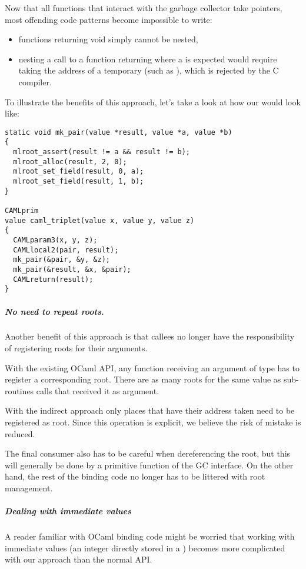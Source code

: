 \documentclass[a4paper]{easychair}
\newcommand{\cpp}[1]{\smash{\lstinline[style=C++]{#1}}}
\begin{document}
Now that all functions that interact with the garbage collector take
pointers, most offending code patterns become impossible to write:

\begin{itemize}
\item functions returning void simply cannot be nested,
\item nesting a call to a function returning \cpp{value} where a
      \cpp{value*} is expected would require taking the address of a
      temporary (such as \cpp{\&get\_field(x,\ 0)}), which is rejected by the C
      compiler.
\end{itemize}

To illustrate the benefits of this approach, let's take a look at how
our \cpp{triplet} would look like:

\begin{lstlisting}[style=C++]
static void mk_pair(value *result, value *a, value *b)
{
  mlroot_assert(result != a && result != b);
  mlroot_alloc(result, 2, 0);
  mlroot_set_field(result, 0, a);
  mlroot_set_field(result, 1, b);
}

CAMLprim
value caml_triplet(value x, value y, value z)
{
  CAMLparam3(x, y, z);
  CAMLlocal2(pair, result);
  mk_pair(&pair, &y, &z);
  mk_pair(&result, &x, &pair);
  CAMLreturn(result);
}
\end{lstlisting}

\subparagraph{No need to repeat roots.}

Another benefit of this approach is that callees no longer have the
responsibility of registering roots for their arguments.

With the existing OCaml API, any function receiving an argument of type
\cpp{value} has to register a corresponding root. There are as many
roots for the same value as sub-routines calls that received it as argument.

With the indirect approach only places that have their address taken need to be
registered as root. Since this operation is explicit, we believe the risk of
mistake is reduced.

The final consumer also has to be careful when dereferencing the root, but
this will generally be done by a primitive function of the GC interface. On the
other hand, the rest of the binding code no longer has to be littered with root
management.

\subparagraph{Dealing with immediate values}

A reader familiar with OCaml binding code might be worried that working
with immediate values (an integer directly stored in a \cpp{value})
becomes more complicated with our approach than the normal API.
\end{document}
